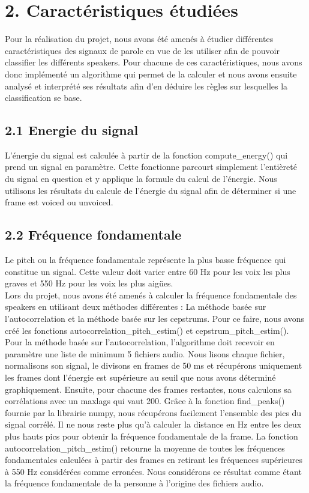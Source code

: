 \documentclass[a4paper,12pt]{report}	%
\begin{document}
{\section*{2. Caractéristiques étudiées}}
Pour la réalisation du projet, nous avons été amenés à étudier différentes caractéristiques des signaux de parole en vue de les utiliser afin de pouvoir classifier les différents speakers. Pour chacune de ces caractéristiques, nous avons donc implémenté un algorithme qui permet de la calculer et nous avons ensuite analysé et interprété ses résultats afin d'en déduire les règles sur lesquelles la classification se base.

{\subsection*{2.1 Energie du signal}}
L'énergie du signal est calculée à partir de la fonction compute\_energy() qui prend un signal en paramètre. Cette fonctionne parcourt simplement l'entièreté du signal en question et y applique la formule du calcul de l'énergie. Nous utilisons les résultats du calcule de l'énergie du signal afin de déterminer si une frame est voiced ou unvoiced.
{\subsection*{2.2 Fréquence fondamentale}}
Le pitch ou la fréquence fondamentale représente la plus basse fréquence qui constitue un signal. Cette valeur doit varier entre 60 Hz pour les voix les plus graves et 550 Hz pour les voix les plus aigües. \\
Lors du projet, nous avons été amenés à calculer la fréquence fondamentale des speakers en utilisant deux méthodes différentes : La méthode basée sur l'autocorrelation et la méthode basée sur les cepstrums. Pour ce faire, nous avons créé les fonctions autocorrelation\_pitch\_estim() et cepstrum\_pitch\_estim(). \\
Pour la méthode basée sur l'autocorrelation, l'algorithme doit recevoir en paramètre une liste de minimum 5 fichiers audio. Nous lisons chaque fichier, normalisons son signal, le divisons en frames de 50 ms et récupérons uniquement les frames dont l'énergie est supérieure au seuil que nous avons déterminé graphiquement. Ensuite, pour chacune des frames restantes, nous calculons sa corrélations avec un maxlags qui vaut 200. Grâce à la fonction find\_peaks() fournie par la librairie numpy, nous récupérons facilement l'ensemble des pics du signal corrélé. Il ne nous reste plus qu'à calculer la distance en Hz entre les deux plus hauts pics pour obtenir la fréquence fondamentale de la frame. La fonction autocorrelation\_pitch\_estim() retourne la moyenne de toutes les fréquences fondamentales calculées à partir des frames en retirant les fréquences supérieures à 550 Hz considérées comme erronées. Nous considérons ce résultat comme étant la fréquence fondamentale de la personne à l'origine des fichiers audio. \\
\end{document}
